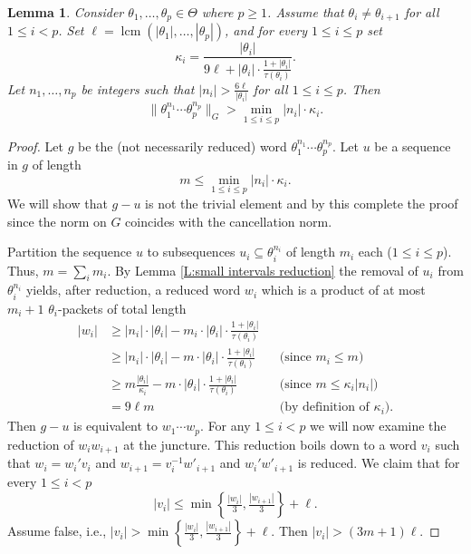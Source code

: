\documentclass[12pt]{amsart}
\newtheorem{lemma}[prop]{Lemma}
\theoremstyle{definition}
\newcommand{\OP}[1]{\operatorname{#1}}
\begin{document}
\begin{lemma}\label{L:non triviality product Theta}
Consider $\theta_1,\dots,\theta_p \in \Theta$  where $p \geq 1$.
Assume that $\theta_i \neq \theta_{i+1}$ for all $1 \leq i <p$.
Set $\ell=\OP{lcm}(|\theta_1|,\dots,|\theta_p|)$, and for every $1 \leq i \leq p$ set
\[
\kappa_i = \frac{|\theta_i|}{9\ell+|\theta_i| \cdot \tfrac{1+|\theta_i|}{\tau(\theta_i)}}.
\]
Let $n_1,\dots,n_p$ be integers such that $|n_i| >\tfrac{6 \ell}{|\theta_i|}$ for all $1 \leq i \leq p$.
Then
\[
\| \theta_1^{n_1} \cdots \theta_p^{n_p} \|_G >\min_{1 \leq i \leq p} |n_i| \cdot \kappa_i.
\]
\end{lemma}


\begin{proof}
Let $g$ be the (not necessarily reduced) word $\theta_1^{n_1} \cdots \theta_p^{n_p}$.
Let $u$ be a sequence in $g$ of length 
\[
m \leq \min_{1 \leq i \leq p} |n_i| \cdot \kappa_i.
\] 
We will show that $g - u$ is not the trivial element and by this complete the proof since the norm on $G$ coincides with the cancellation norm.

Partition the sequence $u$ to subsequences $u_i \subseteq \theta_i^{n_i}$ of length $m_i$ each ($1 \leq i \leq p$).
Thus, $m=\sum_i m_i$.
By Lemma \ref{L:small intervals reduction} the removal of $u_i$ from $\theta_i^{n_i}$ yields, after reduction, a reduced word $w_i$ which is a product of at most $m_i+1$ $\theta_i$-packets of total length
\begin{align*}
|w_i| &\geq 
|n_i| \cdot |\theta_i| -m_i \cdot |\theta_i| \cdot \tfrac{1+|\theta_i|}{\tau(\theta_i)} 
\\
& \geq
|n_i| \cdot |\theta_i| - m \cdot |\theta_i| \cdot \tfrac{1+|\theta_i|}{\tau(\theta_i)} && \text{(since $m_i \leq m$)}
\\
& \geq
m \tfrac{|\theta_i|}{\kappa_i} - m \cdot |\theta_i| \cdot \tfrac{1+|\theta_i|}{\tau(\theta_i)} && \text{(since $m \leq \kappa_i |n_i|$)} \\
& =
9\ell m && \text{(by definition of $\kappa_i$)}.
\end{align*}
Then $g - u$ is equivalent to $w_1 \cdots w_p$. 
For any $1 \leq i <p$ we will now examine the reduction of $w_i w_{i+1}$ at the juncture.
This reduction boils down to a word $v_i$ such that $w_i=w_i'v_i$ and $w_{i+1}=v_i^{-1} w'_{i+1}$ and $w_i'w'_{i+1}$ is reduced.
We claim that for every $1 \leq i <p$
\begin{equation}\label{E:bound on length of v}
|v_i| \leq \min\left\{ \tfrac{|w_i|}{3},\tfrac{|w_{i+1}|}{3} \right\}+\ell.
\end{equation}
Assume false, i.e., $|v_i|>\min\left\{ \tfrac{|w_i|}{3},\tfrac{|w_{i+1}|}{3} \right\}+\ell$.
Then $|v_i|> (3m+1)\ell$.


\end{proof}
\end{document}
